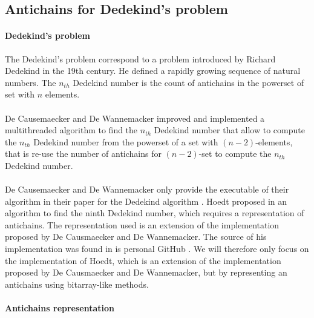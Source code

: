 \documentclass[letterpaper]{article}
\theoremstyle{definition}
\begin{document}
\subsection{Antichains for Dedekind's problem}

\label{sota_hoedts}

\paragraph{Dedekind's problem}

The Dedekind's problem correspond to a problem introduced by Richard
Dedekind in the 19th century. He defined a rapidly growing sequence
of natural numbers. The $n_{th}$ Dedekind number is the count
of antichains in the powerset of set with $n$ elements.

\paragraph{}

De Causemaecker and De Wannemacker \cite{causemaecker1} improved and
implemented a multithreaded algorithm to find the $n_{th}$ Dedekind number
that allow to compute the $n_{th}$ Dedekind number from the powerset
of a set with $(n-2)$-elements, that is re-use the number of antichains
for $(n-2)$-set to compute the $n_{th}$ Dedekind number.


\paragraph{}

De Causemaecker and De Wannemacker only provide the executable of
their algorithm in their paper for
the Dedekind algorithm \cite{causemaecker1}. Hoedt proposed in \cite{hoedt}
an algorithm to find the ninth Dedekind number, which requires a representation
of antichains. The representation used is an extension of the implementation
proposed by De Causmaecker and De Wannemacker. The source of his
implementation was found in is personal GitHub \cite{hoedt_src}.
We will therefore only focus on the implementation
of Hoedt, which is an extension of the implementation proposed
by De Causmaecker and De Wannemacker, but by representing an antichains
using bitarray-like methods.

\paragraph{Antichains representation}
\end{document}
